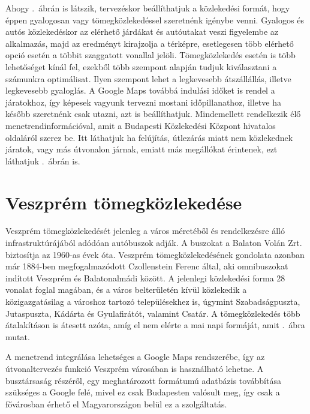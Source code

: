 Ahogy .\ ábrán is látszik, tervezéskor beállíthatjuk a közlekedési formát, hogy éppen gyalogosan vagy tömegközlekedéssel szeretnénk igénybe venni. 
Gyalogos és autós közlekedéskor az elérhető járdákat és autóutakat veszi figyelembe az alkalmazás, majd az eredményt kirajzolja a térképre, esetlegesen több elérhető opció esetén a többit szaggatott vonallal jelöli. 
Tömegközlekedés esetén is több lehetőséget kínál fel, ezekből több szempont alapján tudjuk kiválasztani a számunkra optimálisat. 
Ilyen szempont lehet a legkevesebb átszállállás, illetve legkevesebb gyaloglás. 
A Google Maps továbbá indulási időket is rendel a járatokhoz, így képesek vagyunk tervezni mostani időpillanathoz, illetve ha később szeretnénk csak utazni, azt is beállíthatjuk. 
Mindemellett rendelkezik élő menetrendinformációval, amit a Budapesti Közlekedési Központ hivatalos oldaláról szerez be. 
Itt láthatjuk ha felújítás, útlezárás miatt nem közlekednek járatok, vagy más útvonalon járnak, emiatt más megállókat érintenek, ezt láthatjuk .\ ábrán is. 




\section{Veszprém tömegközlekedése}
\label{veszpremtomeg}

Veszprém tömegközlekedését jelenleg a város méretéből és rendelkezésre álló infrastruktúrájából adódóan autóbuszok adják. 
A buszokat a Balaton Volán Zrt. biztosítja az 1960-as évek óta. 
Veszprém tömegközlekedésének gondolata azonban már 1884-ben megfogalmazódott Czollenstein Ferenc által, aki omnibuszokat indított Veszprém és Balatonalmádi között. 
A jelenlegi közlekedési forma 28 vonalat foglal magában, és a város belterületén kívül közlekedik a közigazgatásilag a városhoz tartozó településekhez is, úgymint  Szabadságpuszta, Jutaspuszta, Kádárta és Gyulafirátót, valamint Csatár. 
A tömegközlekedés több átalakításon is átesett azóta, amíg el nem elérte a mai napi formáját, amit .\ ábra mutat.

A menetrend integrálása lehetséges a Google Maps rendszerébe, így az útvonaltervezés funkció Veszprém városában is használható lehetne. 
A busztársaság részéről, egy meghatározott formátumú adatbázis továbbítása szükséges a Google felé, mivel ez csak Budapesten valósult meg, így csak a fővárosban érhető el Magyarországon belül ez a szolgáltatás. 

